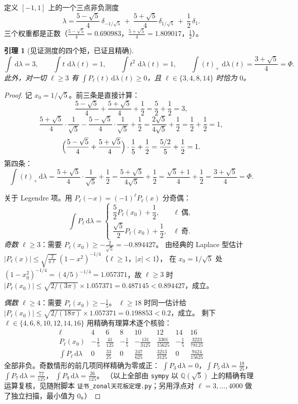 \documentclass[UTF8,11pt]{ctexart}
\newtheorem{lemma}[theorem]{引理}
\theoremstyle{definition}
\newcommand{\dd}{\,\mathrm{d}}
\newcommand{\Q}{\mathbb{Q}}
\begin{document}
定义 $[-1,1]$ 上的一个三点非负测度
\begin{equation}\label{eq:lam}
\lambda=\frac{5-\sqrt5}{4}\,\delta_{-1/\sqrt5}\ +\ \frac{5+\sqrt5}{4}\,\delta_{1/\sqrt5}\ +\ \frac12\,\delta_{1}.
\end{equation}
三个权重都是正数（$\frac{5-\sqrt5}{4}=0.690983$，$\frac{5+\sqrt5}{4}=1.809017$，$\frac12$）。

\begin{lemma}[见证测度的四个矩，已证且精确]\label{lem:moments}
\[
\int\dd\lambda=3,\qquad \int t\,\dd\lambda(t)=1,\qquad \int t^2\,\dd\lambda(t)=1,\qquad
\int (t)_+\,\dd\lambda(t)=\frac{3+\sqrt5}{4}=\Phi .
\]
此外，对一切 $\ell\ge3$ 有 $\int P_\ell(t)\dd\lambda(t)\ge0$，且 $\ell\in\{3,4,8,14\}$ 时恰为 $0$。
\end{lemma}

\begin{proof}
记 $x_0=1/\sqrt5$。前三条是直接计算：
\[
\frac{5-\sqrt5}{4}+\frac{5+\sqrt5}{4}+\frac12=\frac52+\frac12=3,
\]
\[
\frac{5+\sqrt5}{4}\cdot\frac1{\sqrt5}-\frac{5-\sqrt5}{4}\cdot\frac1{\sqrt5}+\frac12
=\frac{2\sqrt5}{4\sqrt5}+\frac12=\frac12+\frac12=1,
\]
\[
\Bigl(\frac{5-\sqrt5}{4}+\frac{5+\sqrt5}{4}\Bigr)\cdot\frac15+\frac12=\frac{5/2}{5}+\frac12=1 .
\]
第四条：
\[
\int(t)_+\dd\lambda=\frac{5+\sqrt5}{4}\cdot\frac1{\sqrt5}+\frac12
=\frac{5+\sqrt5}{4\sqrt5}+\frac12=\frac{\sqrt5+1}{4}+\frac12=\frac{3+\sqrt5}{4}=\Phi .
\]

关于 Legendre 项。用 $P_\ell(-x)=(-1)^\ell P_\ell(x)$ 分奇偶：
\[
\int P_\ell\dd\lambda=\begin{cases}
\dfrac52P_\ell(x_0)+\dfrac12, & \ell\ \text{偶},\\[6pt]
\dfrac{\sqrt5}{2}P_\ell(x_0)+\dfrac12, & \ell\ \text{奇}.
\end{cases}
\]
\emph{奇数 $\ell\ge3$}：需要 $P_\ell(x_0)\ge-\frac{2}{\sqrt5}=-0.894427$。
由经典的 Laplace 型估计 $|P_\ell(x)|\le\sqrt{\frac{2}{\pi\ell}}\,(1-x^2)^{-1/4}$（$\ell\ge1$，$|x|<1$），
在 $x_0=1/\sqrt5$ 处 $(1-x_0^2)^{-1/4}=(4/5)^{-1/4}=1.057371$，故
$\ell\ge3$ 时 $|P_\ell(x_0)|\le\sqrt{2/(3\pi)}\times1.057371=0.487145<0.894427$，成立。

\emph{偶数 $\ell\ge4$}：需要 $P_\ell(x_0)\ge-\frac15$。
$\ell\ge18$ 时同一估计给 $|P_\ell(x_0)|\le\sqrt{2/(18\pi)}\times1.057371=0.198853<0.2$，成立。
剩下 $\ell\in\{4,6,8,10,12,14,16\}$ 用精确有理算术逐个核验：
\[
\begin{array}{c|ccccccc}
\ell & 4 & 6 & 8 & 10 & 12 & 14 & 16\\
\hline
P_\ell(x_0) & -\frac15 & \frac{41}{125} & -\frac15 & -\frac{131}{3125} & \frac{3301}{15625} & -\frac15 & \frac{3223}{78125}\\[3pt]
\int P_\ell\dd\lambda & 0 & \frac{33}{25} & 0 & \frac{247}{625} & \frac{3213}{3125} & 0 & \frac{9424}{15625}
\end{array}
\]
全部非负。奇数情形的前几项同样精确为零或正：
$\int P_3\dd\lambda=0$，$\int P_5\dd\lambda=\frac{18}{25}$，$\int P_7\dd\lambda=\frac{77}{125}$，
$\int P_9\dd\lambda=\frac{26}{125}$。
（以上全部由 \texttt{sympy} 以 $\Q(\sqrt5)$ 上的精确有理运算复核，见随附脚本
\texttt{证书\_zonal天花板定理.py}；另用浮点对 $\ell=3,\dots,4000$ 做了独立扫描，最小值为 $0$。）
\end{proof}
\end{document}
